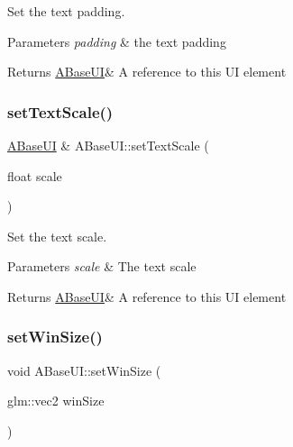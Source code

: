 Set the text padding. 


\begin{DoxyParams}{Parameters}
{\em padding} & the text padding \\
\hline
\end{DoxyParams}
\begin{DoxyReturn}{Returns}
\hyperlink{class_a_base_u_i}{A\+Base\+UI}\& A reference to this UI element 
\end{DoxyReturn}
\mbox{\label{class_a_base_u_i_a980fa680f895fdefb7ee94ba022cd29b}} 
\subsubsection{\texorpdfstring{set\+Text\+Scale()}{setTextScale()}}
{\footnotesize\ttfamily \hyperlink{class_a_base_u_i}{A\+Base\+UI} \& A\+Base\+U\+I\+::set\+Text\+Scale (\begin{DoxyParamCaption}\item[{float}]{scale }\end{DoxyParamCaption})\hspace{0.3cm}{\ttfamily [virtual]}}



Set the text scale. 


\begin{DoxyParams}{Parameters}
{\em scale} & The text scale \\
\hline
\end{DoxyParams}
\begin{DoxyReturn}{Returns}
\hyperlink{class_a_base_u_i}{A\+Base\+UI}\& A reference to this UI element 
\end{DoxyReturn}
\mbox{\label{class_a_base_u_i_a7d1d35a35a1676cc00ffa0b63c0b8a7f}} 
\subsubsection{\texorpdfstring{set\+Win\+Size()}{setWinSize()}}
{\footnotesize\ttfamily void A\+Base\+U\+I\+::set\+Win\+Size (\begin{DoxyParamCaption}\item[{glm\+::vec2}]{win\+Size }\end{DoxyParamCaption})\hspace{0.3cm}{\ttfamily [static]}}




